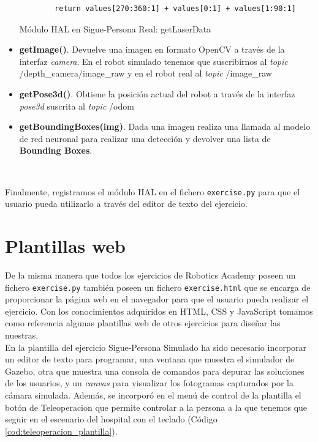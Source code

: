\begin{itemize}
\begin{code}[H]
\begin{lstlisting}
		return values[270:360:1] + values[0:1] + values[1:90:1]
	\end{lstlisting}
	\caption{Módulo HAL en Sigue-Persona Real: getLaserData}
	\label{cod:real_follow_person_hal_laser}
\end{code}
	\item \textbf{getImage()}. Devuelve una imagen en formato OpenCV a través de la interfaz \textit{camera}. En el robot simulado tenemos que suscribirnos al \textit{topic} /depth\_camera/image\_raw y en el robot real al \textit{topic} /image\_raw
	\item \textbf{getPose3d()}. Obtiene la posición actual del robot a través de la interfaz \textit{pose3d} suscrita al \textit{topic} /odom
	\item \textbf{getBoundingBoxes(img)}. Dada una imagen realiza una llamada al modelo de red neuronal para realizar una detección y devolver una lista de \textbf{Bounding Boxes}.  
\end{itemize}\

Finalmente, registramos el módulo HAL en el fichero \texttt{exercise.py} para que el usuario pueda utilizarlo a través del editor de texto del ejercicio.\\

\cleardoublepage

\section{Plantillas web}
\label{subsec:plantillas_web}

De la misma manera que todos los ejercicios de Robotics Academy poseen un fichero \texttt{exercise.py} también poseen un fichero \texttt{exercise.html} que se encarga de proporcionar la página web en el navegador para que el usuario pueda realizar el ejercicio. Con los conocimientos adquiridos en HTML, CSS y JavaScript tomamos como referencia algunas plantillas web de otros ejercicios para diseñar las nuestras.\\

En la plantilla del ejercicio Sigue-Persona Simulado ha sido necesario incorporar un editor de texto para programar, una ventana que muestra el simulador de Gazebo, otra que muestra una consola de comandos para depurar las soluciones de los usuarios, y un \textit{canvas} para visualizar los fotogramas capturados por la cámara simulada. Además, se incorporó en el menú de control de la plantilla el botón de Teleoperacion que permite controlar a la persona a la que tenemos que seguir en el escenario del hospital con el teclado (Código \ref{cod:teleoperacion_plantilla}).\\

